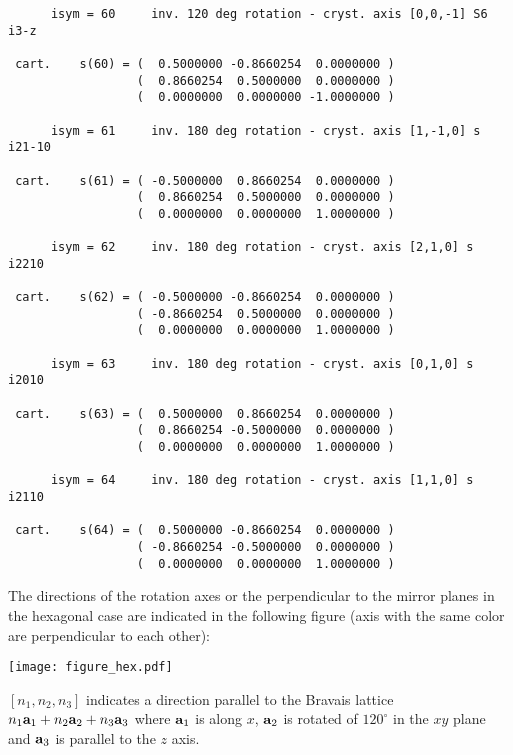 \documentclass[12pt,a4paper,twoside]{report}
\begin{document}
\begin{tcolorbox}
\begin{scriptsize}
\begin{verbatim}
      isym = 60     inv. 120 deg rotation - cryst. axis [0,0,-1] S6    i3-z

 cart.    s(60) = (  0.5000000 -0.8660254  0.0000000 )
                  (  0.8660254  0.5000000  0.0000000 )
                  (  0.0000000  0.0000000 -1.0000000 )

      isym = 61     inv. 180 deg rotation - cryst. axis [1,-1,0] s     i21-10

 cart.    s(61) = ( -0.5000000  0.8660254  0.0000000 )
                  (  0.8660254  0.5000000  0.0000000 )
                  (  0.0000000  0.0000000  1.0000000 )

      isym = 62     inv. 180 deg rotation - cryst. axis [2,1,0] s      i2210

 cart.    s(62) = ( -0.5000000 -0.8660254  0.0000000 )
                  ( -0.8660254  0.5000000  0.0000000 )
                  (  0.0000000  0.0000000  1.0000000 )

      isym = 63     inv. 180 deg rotation - cryst. axis [0,1,0] s      i2010

 cart.    s(63) = (  0.5000000  0.8660254  0.0000000 )
                  (  0.8660254 -0.5000000  0.0000000 )
                  (  0.0000000  0.0000000  1.0000000 )

      isym = 64     inv. 180 deg rotation - cryst. axis [1,1,0] s      i2110

 cart.    s(64) = (  0.5000000 -0.8660254  0.0000000 )
                  ( -0.8660254 -0.5000000  0.0000000 )
                  (  0.0000000  0.0000000  1.0000000 )

\end{verbatim}
\end{scriptsize}
\end{tcolorbox}

The directions of the rotation axes or the perpendicular to the mirror
planes in the hexagonal case are indicated in the following figure
(axis with the same color are perpendicular to each other):
\begin{center}
\texttt{[image: figure\_hex.pdf]} 
\end{center}
$[n_1,n_2,n_3]$ indicates a direction parallel
to the Bravais lattice $n_1 {\bf a}_1 + n_2 {\bf a}_2 + n_3 {\bf a}_3$
where ${\bf a}_1$ is along $x$, ${\bf a}_2$ is rotated 
of $120^\circ$ in the $xy$ plane and ${\bf a}_3$ is parallel to the $z$
axis.
\end{document}
